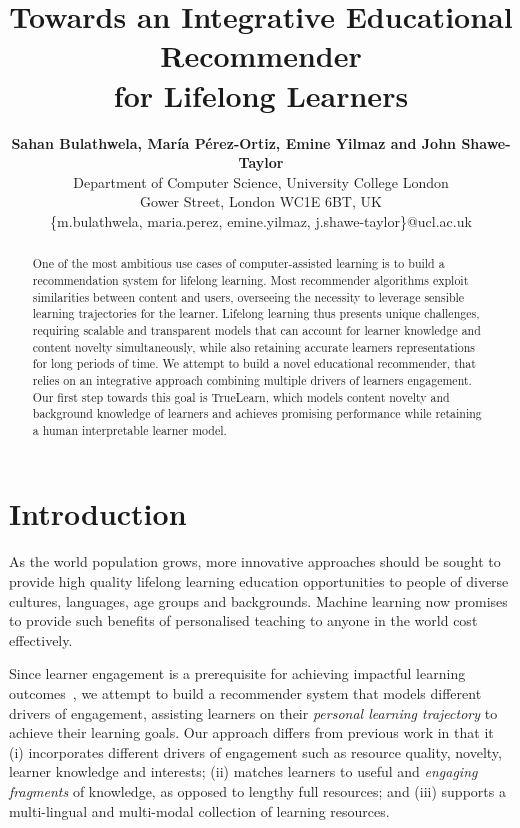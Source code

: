 \documentclass[letterpaper]{article} %
\title{Towards an Integrative Educational Recommender \\ for Lifelong Learners
}
\author{
\Large \textbf{Sahan Bulathwela, Mar\'ia P\'erez-Ortiz, Emine Yilmaz and John Shawe-Taylor}\\ %
Department of Computer Science, University College London \\
Gower Street, London WC1E 6BT, UK\\ %
\{m.bulathwela, maria.perez, emine.yilmaz, j.shawe-taylor\}@ucl.ac.uk  %
}
\begin{document}
\maketitle

\begin{abstract}

One of the most ambitious use cases of computer-assisted learning is to build a recommendation system for lifelong learning. Most recommender algorithms exploit similarities between content and users, overseeing the necessity to leverage sensible learning trajectories for the learner. Lifelong learning thus presents unique challenges, requiring scalable and transparent models that can account for learner knowledge and content novelty simultaneously, while also retaining accurate learners representations for long periods of time. We attempt to build a novel educational recommender, that relies on an integrative approach combining multiple drivers of learners engagement. Our first step towards this goal is TrueLearn, which models content novelty and background knowledge of learners and achieves promising performance while retaining a human interpretable learner model.


\end{abstract}

\section{Introduction}
As the world population grows, more innovative approaches should be sought to provide  high quality lifelong learning education opportunities to people of diverse cultures, languages, age groups and backgrounds.
Machine learning now promises to provide such benefits of personalised teaching to anyone in the world cost effectively.



Since learner engagement is a prerequisite for achieving impactful learning outcomes~\cite{lan2017behavior}, we attempt to build a recommender system that models different drivers of engagement,
assisting learners on their \emph{personal learning trajectory} to achieve their learning goals. Our approach differs from previous work in that it (i) incorporates different drivers of engagement such as resource quality, novelty, learner knowledge and interests; (ii) matches learners to useful and \emph{engaging fragments} of knowledge, as opposed to lengthy full resources; and (iii) supports a multi-lingual and multi-modal collection of learning resources.
\end{document}
